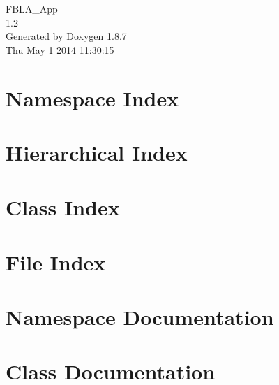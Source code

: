 \documentclass[twoside]{book}
\newcommand{\+}{\discretionary{\mbox{\scriptsize$\hookleftarrow$}}{}{}}
\newcommand{\clearemptydoublepage}{%
  \newpage{\pagestyle{empty}\cleardoublepage}%
}
\begin{document}
\hypersetup{pageanchor=false,
             bookmarks=true,
             bookmarksnumbered=true,
             pdfencoding=unicode
            }
\begin{titlepage}
\vspace*{7cm}
\begin{center}%
{\Large F\+B\+L\+A\+\_\+\+App \\[1ex]\large 1.\+2 }\\
\vspace*{1cm}
{\large Generated by Doxygen 1.8.7}\\
\vspace*{0.5cm}
{\small Thu May 1 2014 11:30:15}\\
\end{center}
\end{titlepage}
\clearemptydoublepage
\tableofcontents
\clearemptydoublepage
{}
\hypersetup{pageanchor=true}

\chapter{Namespace Index}

\chapter{Hierarchical Index}

\chapter{Class Index}

\chapter{File Index}

\chapter{Namespace Documentation}


\chapter{Class Documentation}





\end{document}

